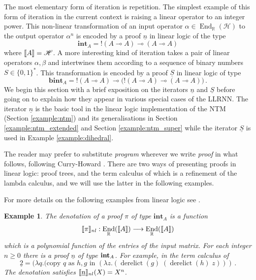 \documentclass[english,letter paper,12pt,leqno]{article}
\theoremstyle{example}
\newtheorem{example}[theorem]{Example}
\numberwithin{equation}{section}
\DeclareMathOperator{\End}{End}
\DeclareMathOperator{\derelict}{derelict}
\begin{document}
The most elementary form of iteration is repetition. The simplest example of this form of iteration in the current context is raising a linear operator to an integer power. This non-linear transformation of an input operator $\alpha \in \End_{\mathbb{R}}(\mathscr{H})$ to the output operator $\alpha^n$ is encoded by a proof $\underline{n}$ in linear logic of the type
\[
\textbf{int}_A = {!}(A \multimap A) \multimap (A \multimap A)
\]
where $\llbracket A \rrbracket = \mathscr{H}$. A more interesting kind of iteration takes a pair of linear operators $\alpha, \beta$ and intertwines them according to a sequence of binary numbers $S \in \{0,1\}^*$. This transformation is encoded by a proof $\underline{S}$ in linear logic of type
\[
\textbf{bint}_A = {!}(A \multimap A) \multimap \big({!}(A \multimap A) \multimap (A \multimap A)\big)\,.
\]
We begin this section with a brief exposition on the iterators $\underline{n}$ and $\underline{S}$ before going on to explain how they appear in various special cases of the LLRNN. The iterator $\underline{n}$ is the basic tool in the linear logic implementation of the NTM (Section \ref{example:ntm}) and its generalisations in Section \ref{example:ntm_extended} and Section \ref{example:ntm_super} while the iterator $\underline{S}$ is used in Example \ref{example:dihedral}. 

The reader may prefer to substitute \emph{program} wherever we write \emph{proof} in what follows, following Curry-Howard \cite{sorensen}. There are two ways of presenting proofs in linear logic: proof trees, and the term calculus of \cite{benton_etal} which is a refinement of the lambda calculus, and we will use the latter in the following examples.
\vspace{0.25cm}

For more details on the following examples from linear logic see \cite[\S 3]{murfetclift}. 

\begin{example}\label{example_1} The denotation of a proof $\pi$ of type $\textbf{int}_A$ is a function
\[
\den{\pi}_{nl}: \End_{\mathbb{R}}(\den{A}) \lto \End_{\mathbb{R}}(\den{A})
\]
which is a polynomial function of the entries of the input matrix. For each integer $n \ge 0$ there is a proof $\underline{n}$ of type $\textbf{int}_A$. For example, in the term calculus of \cite{benton_etal}
\[
\underline{2} = (\lambda q.(\textrm{copy $q$ as $h,g$ in } (\lambda z. (\derelict(g) \; (\derelict(h)\; z)))\,.
\]
The denotation satisfies $\llbracket \underline{n} \rrbracket_{nl}(X) = X^n$. %
\end{example}
\end{document}
